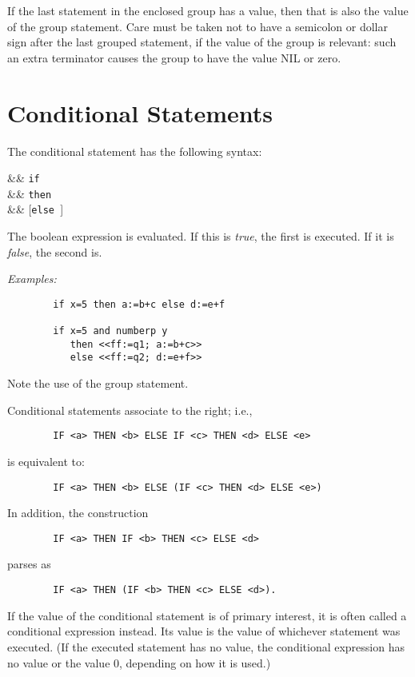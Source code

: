 If the last statement in the enclosed group has a value, then that is also
the value of the group statement.  Care must be taken not to have a
semicolon or dollar sign after the last grouped statement, if the value of
the group is relevant: such an extra terminator causes the group to have
the value NIL or zero.

\section{Conditional Statements}
\hypertarget{command:IF}{}
\hypertarget{reserved:THEN}{}
\hypertarget{reserved:ELSE}{}

The conditional statement
has the following syntax:
\begin{syntaxtable}
  &\BNFprod &
 \texttt{if } \\
      && \texttt{then } \\
      && [\texttt{else }]
\end{syntaxtable}
The boolean expression is evaluated. If this is \emph{true}, the first
 is executed.  If it is \emph{false}, the second is.

\textit{Examples:}
\begin{verbatim}
        if x=5 then a:=b+c else d:=e+f

        if x=5 and numberp y
           then <<ff:=q1; a:=b+c>>
           else <<ff:=q2; d:=e+f>>
\end{verbatim}
Note the use of the group statement.

Conditional statements associate to the right; i.e.,
\begin{verbatim}
        IF <a> THEN <b> ELSE IF <c> THEN <d> ELSE <e>
\end{verbatim}
is equivalent to:
\begin{verbatim}
        IF <a> THEN <b> ELSE (IF <c> THEN <d> ELSE <e>)
\end{verbatim}
In addition, the construction
\begin{verbatim}
        IF <a> THEN IF <b> THEN <c> ELSE <d>
\end{verbatim}
parses as
\begin{verbatim}
        IF <a> THEN (IF <b> THEN <c> ELSE <d>).
\end{verbatim}
If the value of the conditional statement is of primary interest, it is often called a conditional
expression instead.  Its value is the value of whichever statement was
executed. (If the executed statement has no value, the conditional
expression has no value or the value 0, depending on how it is used.)

